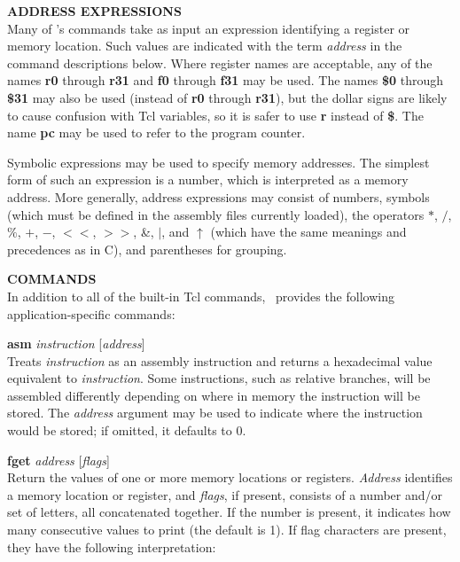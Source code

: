 \begin{mylist}
\item[{\bf ADDRESS EXPRESSIONS}]
\nopagebreak \hfill \\
Many of {\dlxsim}'s commands take as input an expression identifying a
register or memory location.  Such values are indicated with the term
{\em address} in the command descriptions below.  Where register names
are acceptable, any of the names {\bf r0} through {\bf r31} and {\bf
f0} through {\bf f31} may be used.  The names {\bf \$0} through {\bf
\$31} may also be used (instead of {\bf r0} through {\bf r31}), but the
dollar signs are likely to cause confusion with Tcl variables, so it
is safer to use {\bf r} instead of {\bf \$}.  The name {\bf pc} may be
used to refer to the program counter.

Symbolic expressions may be used to specify memory addresses.  The
simplest form of such an expression is a number, which is interpreted
as a memory address.  More generally, address expressions may consist of
numbers, symbols (which must be defined in the assembly files
currently loaded), the operators $*$, $/$, $\%$, $+$, $-$, $<<$, $>>$, \&, $|$,
and $\uparrow$ (which have the same meanings and precedences as in C), and
parentheses for grouping.

\item[{\bf COMMANDS}]
\nopagebreak \hfill \\
In addition to all of the built-in Tcl commands, \dlxsim\ provides the following application-specific commands:

\begin{mylist}
\item[{\bf asm} {\em instruction} {[}{\em address}{]}]
\nopagebreak \hfill \\
Treats {\em instruction} as an assembly instruction and returns a
hexadecimal value equivalent to {\em
instruction}.  Some instructions, such as relative branches, will be
assembled differently depending on where in memory the instruction
will be stored.  The {\em address} argument may be used to indicate
where the instruction would be stored; if omitted, it defaults to 0.

\item[{\bf fget} {\em address} {[}{\em flags}{]}]
\nopagebreak \hfill \\
Return the values of one or more memory locations or registers.  {\em
Address} identifies a memory location or register, and {\em flags}, if
present, consists of a number and/or set of letters, all concatenated
together.  If the number is present, it indicates how many consecutive
values to print (the default is 1).  If flag characters are present,
they have the following interpretation:


\end{mylist}
\end{mylist}
